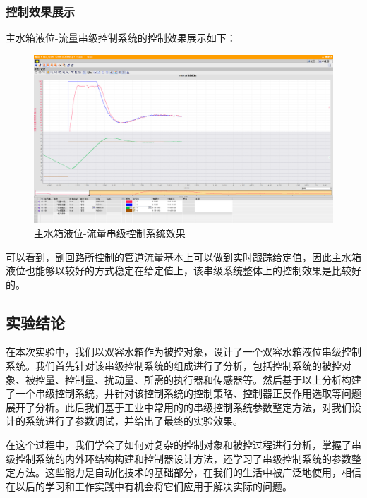 \documentclass[UTF8]{article}
\begin{document}
\subsubsection{控制效果展示}
主水箱液位-流量串级控制系统的控制效果展示如下：
\begin{figure}[H]
    \centering %
    \includegraphics[width=1\textwidth]{figure/串级控制效果.png} 
    \caption{主水箱液位-流量串级控制系统效果} %
\end{figure}
可以看到，副回路所控制的管道流量基本上可以做到实时跟踪给定值，因此主水箱液位也能够以较好的方式稳定在给定值上，该串级系统整体上的控制效果是比较好的。

\subsection{实验结论}

在本次实验中，我们以双容水箱作为被控对象，设计了一个双容水箱液位串级控制系统。我们首先针对该串级控制系统的组成进行了分析，包括控制系统的被控对象、被控量、控制量、扰动量、所需的执行器和传感器等。然后基于以上分析构建了一个串级控制系统，并针对该控制系统的控制策略、控制器正反作用选取等问题展开了分析。此后我们基于工业中常用的的串级控制系统参数整定方法，对我们设计的系统进行了参数调试，并给出了最终的实验效果。

在这个过程中，我们学会了如何对复杂的控制对象和被控过程进行分析，掌握了串级控制系统的内外环结构构建和控制器设计方法，还学习了串级控制系统的参数整定方法。这些能力是自动化技术的基础部分，在我们的生活中被广泛地使用，相信在以后的学习和工作实践中有机会将它们应用于解决实际的问题。
\end{document}
